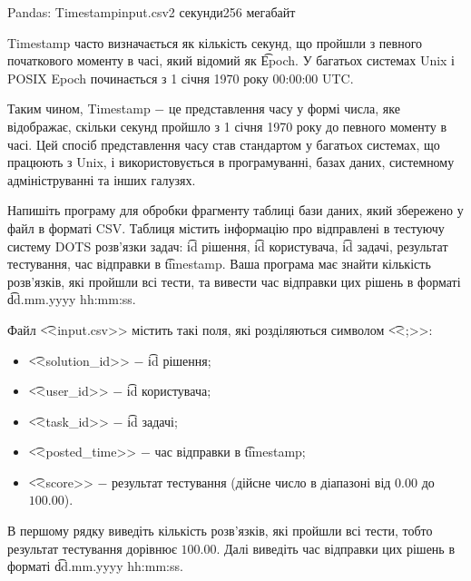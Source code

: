 \begin{problem}{Pandas: Timestamp}{input.csv}{}{2 секунди}{256 мегабайт}

Timestamp часто визначається як кількість секунд, що пройшли з певного початкового моменту в часі, який відомий як \t{Epoch}. 
У багатьох системах Unix і POSIX Epoch починається з 1 січня 1970 року 00:00:00 UTC.

Таким чином, Timestamp $-$ це представлення часу у формі числа, яке відображає, 
скільки секунд пройшло з 1 січня 1970 року до певного моменту в часі. 
Цей спосіб представлення часу став стандартом у багатьох системах, що працюють з Unix, 
і використовується в програмуванні, базах даних, системному адмініструванні та інших галузях.

Напишіть програму для обробки фрагменту таблиці бази даних, який збережено у файл в форматі CSV.
Таблиця містить інформацію про відправлені в тестуючу систему DOTS розв'язки задач: 
\t{id} рішення, \t{id} користувача, \t{id} задачі, результат тестування, час відправки в \t{timestamp}.
Ваша програма має знайти кількість розв'язків, які пройшли всі тести, та вивести час відправки цих рішень в форматі
\t{dd.mm.yyyy hh:mm:ss}.

\InputFile
Файл \t{<<input.csv>>} містить такі поля, які розділяються символом \t{<<;>>}:
\begin{itemize}
  \setlength\itemsep{0em}
  \item \t{<<solution\_id>>} $-$ \t{id} рішення;
  \item \t{<<user\_id>>} $-$ \t{id} користувача;
  \item \t{<<task\_id>>} $-$ \t{id} задачі;
  \item \t{<<posted\_time>>} $-$ час відправки в \t{timestamp};
  \item \t{<<score>>} $-$ результат тестування (дійсне число в діапазоні від $0.00$ до $100.00$). 
\end{itemize}

\OutputFile
В першому рядку виведіть кількість розв'язків, які пройшли всі тести, тобто результат тестування дорівнює $100.00$.
Далі виведіть час відправки цих рішень в форматі \t{dd.mm.yyyy hh:mm:ss}.

\Example
\begin{example}
%
\end{example}

\end{problem}

